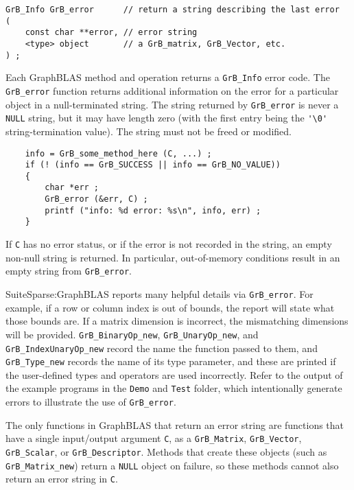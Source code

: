 \documentclass[12pt]{article}
\begin{document}
\begin{mdframed}[userdefinedwidth=6in]
{\footnotesize
\begin{verbatim}
GrB_Info GrB_error      // return a string describing the last error
(
    const char **error, // error string
    <type> object       // a GrB_matrix, GrB_Vector, etc.
) ;
\end{verbatim}
}\end{mdframed}

Each GraphBLAS method and operation returns a \verb'GrB_Info' error code.  The
\verb'GrB_error' function returns additional information on the error for a
particular object in a null-terminated string.  The string returned by
\verb'GrB_error' is never a \verb'NULL' string, but it may have length zero
(with the first entry being the \verb"'\0'" string-termination value).  The
string must not be freed or modified.

    {\footnotesize
    \begin{verbatim}
    info = GrB_some_method_here (C, ...) ;
    if (! (info == GrB_SUCCESS || info == GrB_NO_VALUE))
    {
        char *err ;
        GrB_error (&err, C) ;
        printf ("info: %d error: %s\n", info, err) ;
    } \end{verbatim}}

If \verb'C' has no error status, or if the error is not recorded in
the string, an empty non-null string is returned.  In particular,
out-of-memory conditions result in an empty string from \verb'GrB_error'.

SuiteSparse:GraphBLAS reports many helpful details via \verb'GrB_error'.  For
example, if a row or column index is out of bounds, the report will state what
those bounds are.  If a matrix dimension is incorrect, the mismatching
dimensions will be provided.  \verb'GrB_BinaryOp_new', \verb'GrB_UnaryOp_new',
and \verb'GrB_IndexUnaryOp_new' record the name the function passed to them, and
\verb'GrB_Type_new' records the name of its type parameter, and these are
printed if the user-defined types and operators are used incorrectly.  Refer to
the output of the example programs in the \verb'Demo' and \verb'Test' folder,
which intentionally generate errors to illustrate the use of \verb'GrB_error'.

The only functions in GraphBLAS that return an error string are functions that
have a single input/output argument \verb'C', as a \verb'GrB_Matrix',
\verb'GrB_Vector', \verb'GrB_Scalar', or \verb'GrB_Descriptor'. Methods that
create these objects (such as \verb'GrB_Matrix_new') return a \verb'NULL'
object on failure, so these methods cannot also return an error string in
\verb'C'.
\end{document}
